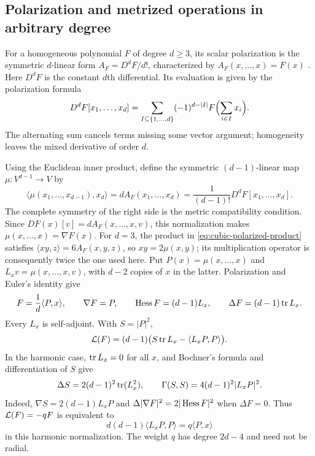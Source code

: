 \subsection{Polarization and metrized operations in arbitrary degree}
\label{sec:higher-metrized-operations}

For a homogeneous polynomial $F$ of degree $d\ge3$, its scalar
polarization is the symmetric $d$-linear form
$A_F=D^dF/d!$, characterized by $A_F(x,\ldots,x)=F(x)$
\cite[Section~2.6.4, equation~(2.6.5)]{Landsberg2012}.
Here $D^dF$ is the constant $d$th differential. Its evaluation is
given by the polarization formula
\[
 D^dF[x_1,\ldots,x_d]
 =\sum_{I\subseteq\{1,\ldots,d\}}(-1)^{d-|I|}
     F\Bigl(\sum_{i\in I}x_i\Bigr).
\]
The alternating sum cancels terms missing some vector argument;
homogeneity leaves the mixed derivative of order $d$.

Using the Euclidean inner product, define the symmetric
$(d-1)$-linear map $\mu:V^{d-1}\to V$ by
\[
 \langle\mu(x_1,\ldots,x_{d-1}),x_d\rangle
       =dA_F(x_1,\ldots,x_d)
       =\frac{1}{(d-1)!}D^dF[x_1,\ldots,x_d].
\]
The complete symmetry of the right side is the metric compatibility
condition. Since $DF(x)[v]=dA_F(x,\ldots,x,v)$, this normalization
makes $\mu(x,\ldots,x)=\nabla F(x)$. For $d=3$, the product in
\eqref{eq:cubic-polarized-product} satisfies
$\langle xy,z\rangle=6A_F(x,y,z)$, so $xy=2\mu(x,y)$;
its multiplication operator is consequently twice the one used here.
Put $P(x)=\mu(x,\ldots,x)$ and
$L_xv=\mu(x,\ldots,x,v)$, with $d-2$ copies of $x$ in the latter.
Polarization and Euler's identity give
\begin{equation}\label{eq:higher-metrized-dictionary}
 F=\frac1d\langle P,x\rangle,\qquad
 \nabla F=P,\qquad \operatorname{Hess} F=(d-1)L_x,\qquad
 \Delta F=(d-1)\operatorname{tr} L_x.
\end{equation}
Every $L_x$ is self-adjoint. With $S=|P|^2$,
\begin{equation}\label{eq:higher-metrized-minimality}
 \mathcal L(F)=(d-1)\bigl(S\operatorname{tr} L_x-\langle L_xP,P\rangle\bigr).
\end{equation}
In the harmonic case, $\operatorname{tr} L_x=0$ for all $x$, and Bochner's formula
and differentiation of $S$ give
\begin{equation}\label{eq:higher-metrized-Bochner}
 \Delta S=2(d-1)^2\operatorname{tr}(L_x^2),\qquad
 \Gamma(S,S)=4(d-1)^2|L_xP|^2.
\end{equation}
Indeed, $\nabla S=2(d-1)L_xP$ and
$\Delta|\nabla F|^2=2|\operatorname{Hess} F|^2$ when $\Delta F=0$.
Thus $\mathcal L(F)=-qF$ is equivalent to
\[
 d(d-1)\langle L_xP,P\rangle=q\langle P,x\rangle
\]
in this harmonic normalization. The weight $q$ has degree $2d-4$
and need not be radial.

